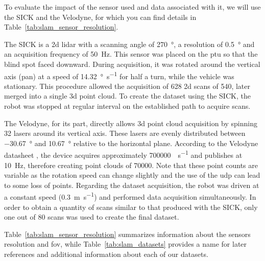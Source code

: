 To evaluate the impact of the sensor used and data associated with it, we will use the SICK and the Velodyne, for which you can find details in Table~\ref{tab:slam_sensor_resolution}.

The SICK is a \gls*{2d} \gls*{lidar} with a scanning angle of \SI{270}{\degree}, a resolution of \SI{0.5}{\degree} and an acquisition frequency of \SI{50}{\hertz}. This sensor was placed on the \gls*{ptu} so that the blind spot faced downward. During acquisition, it was rotated around the vertical axis (pan) at a speed of \SI{14.32}{\degree\per\second} for half a turn, while the vehicle was stationary. This procedure allowed the acquisition of 628 \gls*{2d} scans of \SI{540}{\points}, later merged into a single \gls*{3d} point cloud. To create the dataset using the SICK, the robot was stopped at regular interval on the established path to acquire scans.

The Velodyne, for its part, directly allows \gls*{3d} point cloud acquisition by spinning 32 lasers around its vertical axis. These lasers are evenly distributed between \SI{-30.67}{\degree} and \SI{10.67}{\degree} relative to the horizontal plane. According to the Velodyne datasheet \citep{VelodyneDatasheet}, the device acquires approximately \SI{700000}{\points\per\second} and publishes at \SI{10}{\hertz}, therefore creating point clouds of \SI{70000}{\points}. Note that these point counts are variable as the rotation speed can change slightly and the use of the \gls*{udp} can lead to some loss of points. Regarding the dataset acquisition, the robot was driven at a constant speed (\SI{0.3}{\meter\per\second}) and performed data acquisition simultaneously. In order to obtain a quantity of scans similar to that produced with the SICK, only one out of 80 scans was used to create the final dataset.

Table~\ref{tab:slam_sensor_resolution} summarizes information about the sensors resolution and \gls*{fov}, while Table~\ref{tab:slam_datasets} provides a name for later references and additional information about each of our datasets.

